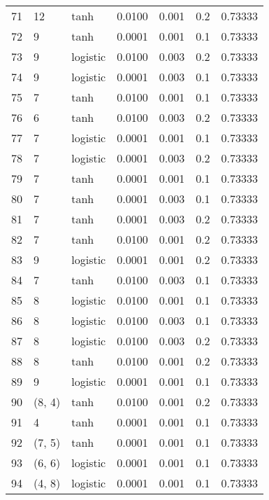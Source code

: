 \begin{tabular}{lllrrrr}
71  &          12 &      tanh &  0.0100 &  0.001 &  0.2 &   0.73333 \\
72  &           9 &      tanh &  0.0001 &  0.001 &  0.1 &   0.73333 \\
73  &           9 &  logistic &  0.0100 &  0.003 &  0.2 &   0.73333 \\
74  &           9 &  logistic &  0.0001 &  0.003 &  0.1 &   0.73333 \\
75  &           7 &      tanh &  0.0100 &  0.001 &  0.1 &   0.73333 \\
76  &           6 &      tanh &  0.0100 &  0.003 &  0.2 &   0.73333 \\
77  &           7 &  logistic &  0.0001 &  0.001 &  0.1 &   0.73333 \\
78  &           7 &  logistic &  0.0001 &  0.003 &  0.2 &   0.73333 \\
79  &           7 &      tanh &  0.0001 &  0.001 &  0.1 &   0.73333 \\
80  &           7 &      tanh &  0.0001 &  0.003 &  0.1 &   0.73333 \\
81  &           7 &      tanh &  0.0001 &  0.003 &  0.2 &   0.73333 \\
82  &           7 &      tanh &  0.0100 &  0.001 &  0.2 &   0.73333 \\
83  &           9 &  logistic &  0.0001 &  0.001 &  0.2 &   0.73333 \\
84  &           7 &      tanh &  0.0100 &  0.003 &  0.1 &   0.73333 \\
85  &           8 &  logistic &  0.0100 &  0.001 &  0.1 &   0.73333 \\
86  &           8 &  logistic &  0.0100 &  0.003 &  0.1 &   0.73333 \\
87  &           8 &  logistic &  0.0100 &  0.003 &  0.2 &   0.73333 \\
88  &           8 &      tanh &  0.0100 &  0.001 &  0.2 &   0.73333 \\
89  &           9 &  logistic &  0.0001 &  0.001 &  0.1 &   0.73333 \\
90  &      (8, 4) &      tanh &  0.0100 &  0.001 &  0.2 &   0.73333 \\
91  &           4 &      tanh &  0.0001 &  0.001 &  0.1 &   0.73333 \\
92  &      (7, 5) &      tanh &  0.0001 &  0.001 &  0.1 &   0.73333 \\
93  &      (6, 6) &  logistic &  0.0001 &  0.001 &  0.1 &   0.73333 \\
94  &      (4, 8) &  logistic &  0.0001 &  0.001 &  0.1 &   0.73333 \\

\end{tabular}

